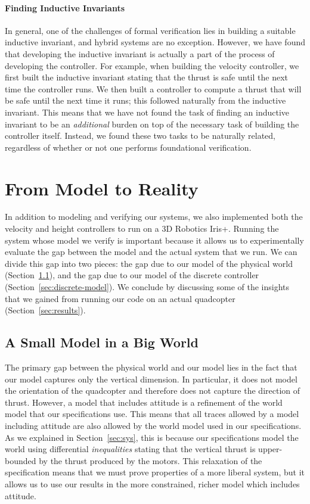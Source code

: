 \paragraph*{Finding Inductive Invariants}
In general, one of the challenges of formal verification lies in building a
suitable inductive invariant, and hybrid systems are no exception.
However, we have found that developing the inductive invariant is actually
a part of the process of developing the controller.  For example, when
building the velocity controller, we first built the inductive invariant
stating that the thrust is safe until the next time the controller runs.
We then built a controller to compute a thrust that will be safe until the
next time it runs; this followed naturally from the inductive invariant.
This means that we have not found the task of finding an inductive
invariant to be an \emph{additional} burden on top of the necessary task of
building the controller itself. Instead, we found these two tasks to be
naturally related, regardless of whether or not one performs foundational
verification.

\section{From Model to Reality}
\label{sec:experiences}
In addition to modeling and verifying our systems, we also implemented both
the velocity and height controllers to run on a 3D Robotics Iris+.  Running
the system whose model we verify is important because it allows us to
experimentally evaluate the gap between the model and the actual system
that we run.  We can divide this gap into two pieces: the gap due to our
model of the physical world (Section~\ref{sec:world-model}), and the gap
due to our model of the discrete controller
(Section~\ref{sec:discrete-model}).  We conclude by discussing some of the
insights that we gained from running our code on an actual quadcopter
(Section~\ref{sec:results}).

\subsection{A Small Model in a Big World}
\label{sec:world-model}

The primary gap between the physical world and our model lies in the fact
that our model captures only the vertical dimension.  In particular, it
does not model the orientation of the quadcopter and therefore does not
capture the direction of thrust.  However, a model that includes attitude
is a refinement of the world model that our specifications use.  This means
that all traces allowed by a model including attitude are also allowed by
the world model used in our specifications.  As we explained in
Section~\ref{sec:sys}, this is because our specifications model the world
using differential \emph{inequalities} stating that the vertical thrust is
upper-bounded by the thrust produced by the motors.  This relaxation of the
specification means that we must prove properties of a more liberal system,
but it allows us to use our results in the more constrained, richer model
which includes attitude.

